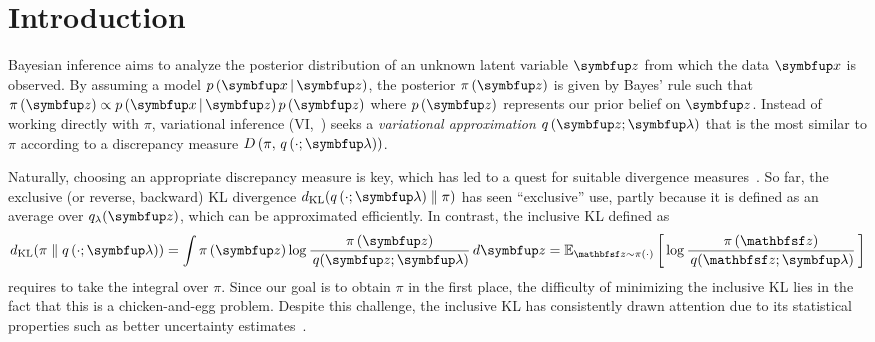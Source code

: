 
\section{Introduction}\label{section:intro}
Bayesian inference aims to analyze the posterior distribution of an unknown latent variable \(\vz\) from which the data \(\vx\) is observed.
By assuming a model \(p\,(\vx\,|\,\vz)\), the posterior \(\pi\,(\vz)\) is given by Bayes' rule such that \(\pi\,(\vz) \propto {p\,(\vx\,|\,\vz)\,p\,(\vz)}\) where \(p\,(\vz)\) represents our prior belief on \(\vz\).
Instead of working directly with \(\pi\), variational inference (VI,~\citealt{blei_variational_2017}) seeks a \textit{variational approximation} \(q\,(\vz; \vlambda)\) that is the most similar to \(\pi\) according to a discrepancy measure \(D\,(\pi,\, q\,(\cdot; \vlambda))\).

Naturally, choosing an appropriate discrepancy measure is key, which has led to a quest for suitable divergence measures~\citep{pmlr-v37-salimans15, NIPS2016_7750ca35, NIPS2017_35464c84, NEURIPS2018_1cd138d0, pmlr-v97-ruiz19a}.
So far, the exclusive (or reverse, backward)  KL divergence \(\DKL{q\left(\cdot; \vlambda\right)}{\pi}\) has seen ``exclusive'' use, partly because it is defined as an average over \(q_{\lambda}(\vz)\), which can be approximated efficiently.
In contrast, the inclusive KL defined as
%
{%
\vspace{-0.05in}
\begin{align*}
  \DKL{\pi}{q\left(\cdot; \vlambda\right)}
  = \int \pi\,(\vz) \log \frac{\pi\left(\vz\right)}{\,q(\vz; \vlambda)} \,d\vz
  = \Esub{\rvvz \sim \pi\left(\cdot\right)}{\log \frac{\pi\left(\rvvz\right)}{\,q(\rvvz; \vlambda)} } %
\end{align*}
}%
%
requires to take the integral over \(\pi\).
Since our goal is to obtain \(\pi\) in the first place, the difficulty of minimizing the inclusive KL lies in the fact that this is a chicken-and-egg problem.
Despite this challenge, the inclusive KL has consistently drawn attention due to its statistical properties such as better uncertainty estimates~\citep{minka2005divergence, mackay_local_2001}.

